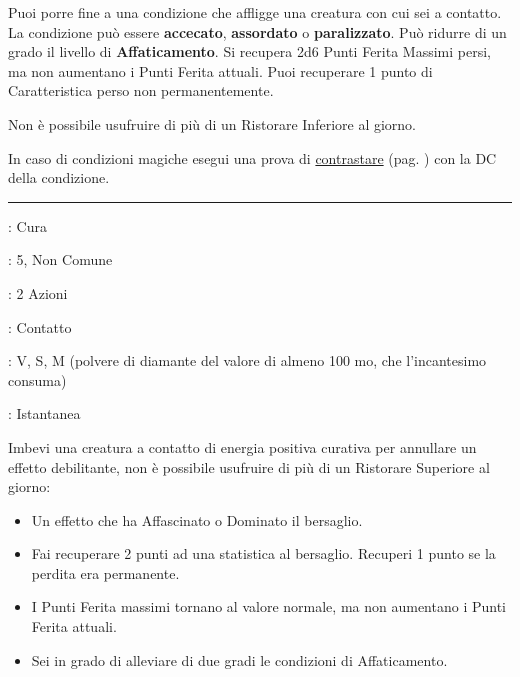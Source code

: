 \begin{multicols}{2}
Puoi porre fine a una condizione che affligge una creatura con cui sei a contatto. La condizione può essere \textbf{accecato}, \textbf{assordato} o \textbf{paralizzato}. Può ridurre di un grado il livello di \textbf{Affaticamento}. Si recupera 2d6 Punti Ferita Massimi persi, ma non aumentano i Punti Ferita attuali. Puoi recuperare 1 punto di Caratteristica perso non permanentemente.

Non è possibile usufruire di più di un Ristorare Inferiore al giorno.

In caso di condizioni magiche esegui una prova di \hyperlink{contrastareincantesimi}{contrastare} (pag. \pageref{contrastareincantesimi}) con la DC della condizione.

\smallskip\noindent\rule{\linewidth}{2pt} \hypertarget{Ristorare Superiore}{}\medskip{}
\noindent
\begin{description}[noitemsep, topsep=0pt, parsep=0pt, partopsep=0pt, leftmargin=0cm, labelwidth=2.8cm]
	\item[\textbf{Lista di Magia}]: Cura
	\item[\textbf{Livello}]: 5, Non Comune
	\item[\textbf{T. di Lancio}]: 2 Azioni
	\item[\textbf{Gittata}]: Contatto
	\item[\textbf{Componenti}]: V, S, M (polvere di diamante del valore di almeno 100 mo, che l'incantesimo consuma)
	\item[\textbf{Durata}]: Istantanea
\end{description}

Imbevi una creatura a contatto di energia positiva curativa per annullare un effetto debilitante, non è possibile usufruire di più di un Ristorare Superiore al giorno:

\begin{itemize}[leftmargin=*] \setlength{\itemsep}{0pt}

	\item Un effetto che ha Affascinato o Dominato il bersaglio.
	\item Fai recuperare 2 punti ad una statistica al bersaglio. Recuperi 1 punto se la perdita era permanente.
	\item I Punti Ferita massimi tornano al valore normale, ma non aumentano i Punti Ferita attuali.
	\item Sei in grado di alleviare di due gradi le condizioni di Affaticamento.
\end{itemize}


\end{multicols}
